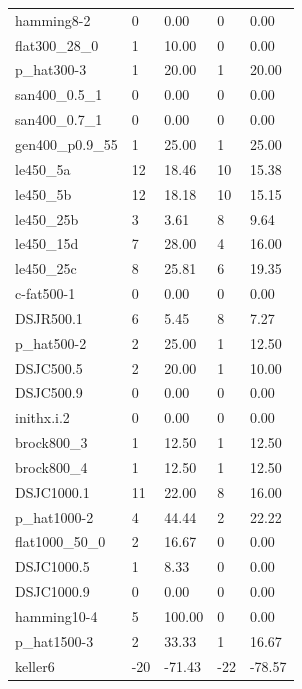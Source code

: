 \begin{table}[h!]
{\begin{tabular}{lllll}
            hamming8-2 & 0 & 0.00 & 0 & 0.00 \\
            flat300\_28\_0 & 1 & 10.00 & 0 & 0.00 \\
            p\_hat300-3 & 1 & 20.00 & 1 & 20.00 \\
            san400\_0.5\_1 & 0 & 0.00 & 0 & 0.00 \\
            san400\_0.7\_1 & 0 & 0.00 & 0 & 0.00 \\
            gen400\_p0.9\_55 & 1 & 25.00 & 1 & 25.00 \\
            le450\_5a & 12 & 18.46 & 10 & 15.38 \\
            le450\_5b & 12 & 18.18 & 10 & 15.15 \\
            le450\_25b & 3 & 3.61 & 8 & 9.64 \\
            le450\_15d & 7 & 28.00 & 4 & 16.00 \\
            le450\_25c & 8 & 25.81 & 6 & 19.35 \\
            c-fat500-1 & 0 & 0.00 & 0 & 0.00 \\
            DSJR500.1 & 6 & 5.45 & 8 & 7.27 \\
            p\_hat500-2 & 2 & 25.00 & 1 & 12.50 \\
            DSJC500.5 & 2 & 20.00 & 1 & 10.00 \\
            DSJC500.9 & 0 & 0.00 & 0 & 0.00 \\
            inithx.i.2 & 0 & 0.00 & 0 & 0.00 \\
            brock800\_3 & 1 & 12.50 & 1 & 12.50 \\
            brock800\_4 & 1 & 12.50 & 1 & 12.50 \\
            DSJC1000.1 & 11 & 22.00 & 8 & 16.00 \\
            p\_hat1000-2 & 4 & 44.44 & 2 & 22.22 \\
            flat1000\_50\_0 & 2 & 16.67 & 0 & 0.00 \\
            DSJC1000.5 & 1 & 8.33 & 0 & 0.00 \\
            DSJC1000.9 & 0 & 0.00 & 0 & 0.00 \\
            hamming10-4 & 5 & 100.00 & 0 & 0.00 \\
            p\_hat1500-3 & 2 & 33.33 & 1 & 16.67 \\
            keller6 & -20 & -71.43 & -22 & -78.57 \\
            \bottomrule
        \end{tabular}
    }{
}
\end{table}
